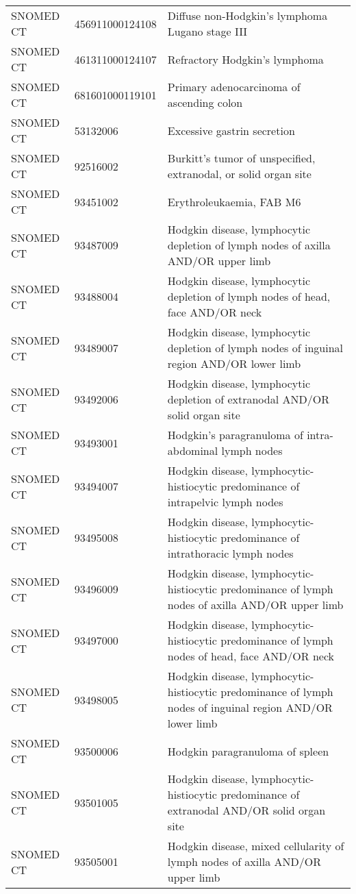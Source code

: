 \begin{longtable}{p{}p{}p{}}
  SNOMED CT & 456911000124108 & Diffuse non-Hodgkin's lymphoma Lugano stage III \\ 
  SNOMED CT & 461311000124107 & Refractory Hodgkin's lymphoma \\ 
  SNOMED CT & 681601000119101 & Primary adenocarcinoma of ascending colon \\ 
  SNOMED CT & 53132006 & Excessive gastrin secretion \\ 
  SNOMED CT & 92516002 & Burkitt's tumor of unspecified, extranodal, or solid organ site \\ 
  SNOMED CT & 93451002 & Erythroleukaemia, FAB M6 \\ 
  SNOMED CT & 93487009 & Hodgkin disease, lymphocytic depletion of lymph nodes of axilla AND/OR upper limb \\ 
  SNOMED CT & 93488004 & Hodgkin disease, lymphocytic depletion of lymph nodes of head, face AND/OR neck \\ 
  SNOMED CT & 93489007 & Hodgkin disease, lymphocytic depletion of lymph nodes of inguinal region AND/OR lower limb \\ 
  SNOMED CT & 93492006 & Hodgkin disease, lymphocytic depletion of extranodal AND/OR solid organ site \\ 
  SNOMED CT & 93493001 & Hodgkin's paragranuloma of intra-abdominal lymph nodes \\ 
  SNOMED CT & 93494007 & Hodgkin disease, lymphocytic-histiocytic predominance of intrapelvic lymph nodes \\ 
  SNOMED CT & 93495008 & Hodgkin disease, lymphocytic-histiocytic predominance of intrathoracic lymph nodes \\ 
  SNOMED CT & 93496009 & Hodgkin disease, lymphocytic-histiocytic predominance of lymph nodes of axilla AND/OR upper limb \\ 
  SNOMED CT & 93497000 & Hodgkin disease, lymphocytic-histiocytic predominance of lymph nodes of head, face AND/OR neck \\ 
  SNOMED CT & 93498005 & Hodgkin disease, lymphocytic-histiocytic predominance of lymph nodes of inguinal region AND/OR lower limb \\ 
  SNOMED CT & 93500006 & Hodgkin paragranuloma of spleen \\ 
  SNOMED CT & 93501005 & Hodgkin disease, lymphocytic-histiocytic predominance of extranodal AND/OR solid organ site \\ 
  SNOMED CT & 93505001 & Hodgkin disease, mixed cellularity of lymph nodes of axilla AND/OR upper limb \\ 

\end{longtable}
